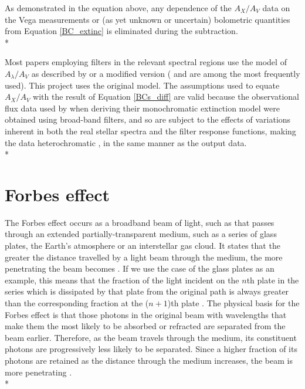 \documentclass[12pt, a4paper]{report}
\begin{document}
As demonstrated in the equation above, any dependence of the $A_{X}/A_{V}$ data on the Vega measurements or (as yet unknown or uncertain) bolometric quantities from Equation \ref{BC_extinc} is eliminated during the subtraction. \\*

Most papers employing filters in the relevant spectral regions use the model of $A_{\lambda}/A_{V}$ as described by \cite{1989ApJ...345..245C} or a modified version (\cite{1994ApJ...422..158O} and \cite{1999PASP..111...63F} are among the most frequently used). This project uses the original model. The assumptions used to equate $A_{X}/A_{V}$ with the result of Equation \ref{BCs_diff} are valid because the observational flux data used by \cite{1989ApJ...345..245C} when deriving their monochromatic extinction model were obtained using broad-band filters, and so are subject to the effects of variations inherent in both the real stellar spectra and the filter response functions, making the data heterochromatic \citep{2014MNRAS.444..392C}, in the same manner as the output data. \\*

\section{Forbes effect}
The Forbes effect occurs as a broadband beam of light, such as that passes through an extended partially-transparent medium, such as a series of glass plates, the Earth's atmosphere or an interstellar gas cloud. It states that the greater the distance travelled by a light beam through the medium, the more penetrating the beam becomes \citep{1842RSPT..132..225F}. If we use the case of the glass plates as an example, this means that the fraction of the light incident on the $n$th plate in the series which is dissipated by that plate from the original path is always greater than the corresponding fraction at the ($n+1$)th plate \citep{1995A&AS..109..293G}. The physical basis for the Forbes effect is that those photons in the original beam with wavelengths that make them the most likely to be absorbed or refracted are separated from the beam earlier. Therefore, as the beam travels through the medium, its constituent photons are progressively less likely to be separated. Since a higher fraction of its photons are retained as the distance through the medium increases, the beam is more penetrating \citep{OHVRIL1999305}.\\*
\end{document}
